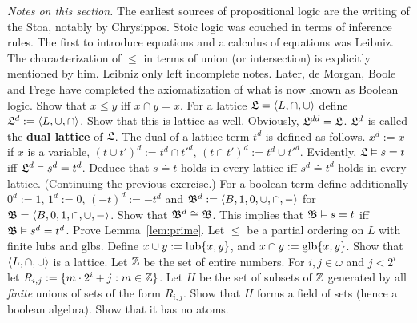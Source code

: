 {\it Notes on this section.} The earliest sources of propositional
logic are the writing of the Stoa, notably by Chrysippos. 
Stoic logic was couched in terms
of inference rules. The first to introduce equations and a calculus
of equations was Leibniz. The characterization of $\leq$ in terms of
union (or intersection) is explicitly mentioned by him. Leibniz
only left incomplete notes. Later, de Morgan, 
Boole and Frege have
completed the axiomatization of what is now known as Boolean logic.
\vplatz
\exercise
Show that $x \leq y$ iff $x \cap y = x$.
\vplatz
\exercise
For a lattice $\mathfrak{L} = \langle L, \cap, \cup\rangle$ define $\mathfrak{L}^d
:= \langle L, \cup, \cap\rangle$. Show that this is lattice as well. 
Obviously, $\mathfrak{L}^{dd} = \mathfrak{L}$. $\mathfrak{L}^d$ is called the 
\textbf{dual lattice} of $\mathfrak{L}$. The dual of a lattice 
term $t^d$ is defined as follows. $x^d := x$ if $x$ is a variable, 
$(t \cup t')^d := t^d \cap {t'}^d$, $(t \cap t')^d := t^d \cup {t'}^d$.
Evidently, $\mathfrak{L} \vDash s = t$ iff $\mathfrak{L}^d \vDash s^d = t^d$.
Deduce that $s \doteq t$ holds in every lattice iff 
$s^d \doteq t^d$ holds in every lattice. 
\vplatz
\exercise
\label{ex:dual}
(Continuing the previous exercise.) For a boolean term define
additionally $0^d := 1$, $1^d := 0$, $(-t)^d := - t^d$ and
$\mathfrak{B}^d := \langle B, 1, 0, \cup, \cap, -\rangle$ for
$\mathfrak{B} = \langle B, 0, 1, \cap, \cup, -\rangle$. Show that $\mathfrak{B}^d \cong
\mathfrak{B}$. This implies that $\mathfrak{B} \vDash s = t$ iff
$\mathfrak{B} \vDash s^d = t^d$.
\vplatz
\exercise
Prove Lemma~\ref{lem:prime}.
\vplatz
\exercise
Let $\leq$ be a partial ordering on $L$ with finite lubs and glbs. 
Define $x \cup y := \operatorname{lub} \{x,y\}$, and $x \cap y := \operatorname{glb} \{x,y\}$. 
Show that $\langle L, \cap, \cup\rangle$ is a lattice.
\vplatz
\exercise
Let $\mathbb{Z}$ be the set of entire numbers. For $i,j \in \omega$ and
$j < 2^i$ let $R_{i,j} := \{m\cdot 2^i + j : m \in \mathbb{Z}\}$. Let
$H$ be the set of subsets of $\mathbb{Z}$ generated by all {\it finite\/}
unions of sets of the form $R_{i,j}$. Show that $H$ forms a
field of sets (hence a boolean algebra). Show that it has no
atoms.

